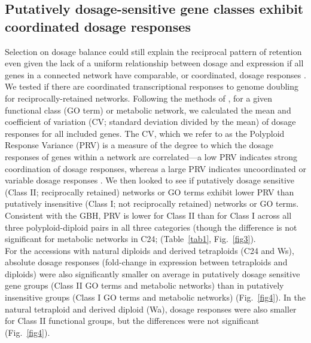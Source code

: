 \documentclass[11pt]{article}
\begin{document}
\subsection*{Putatively dosage-sensitive gene classes exhibit coordinated dosage responses}
Selection on dosage balance could still explain the reciprocal pattern of retention even given the lack of a uniform relationship between dosage and expression if all genes in a connected network have comparable, or coordinated, dosage responses \citep{coate2016}.
We tested if there are coordinated transcriptional responses to genome doubling for reciprocally-retained networks.
Following the methods of \cite{coate2016}, for a given functional class (GO term) or metabolic network, we calculated the mean and coefficient of variation (CV; standard deviation divided by the mean) of dosage responses for all included genes.
The CV, which we refer to as the Polyploid Response Variance (PRV) is a measure of the degree to which the dosage responses of genes within a network are correlated---a low PRV indicates strong coordination of dosage responses, whereas a large PRV indicates uncoordinated or variable dosage responses \citep{coate2016}.
We then looked to see if putatively dosage sensitive (Class II; reciprocally retained) networks or GO terms exhibit lower PRV than putatively insensitive (Class I; not reciprocally retained) networks or GO terms.
Consistent with the GBH, PRV is lower for Class II than for Class I across all three polyploid-diploid pairs in all three categories (though the difference is not significant for metabolic networks in C24; (Table~\ref{tab1}, Fig.~\ref{fig3}).\\

For the accessions with natural diploids and derived tetraploids (C24 and Ws), absolute dosage responses (fold-change in expression between tetraploids and diploids) were also significantly smaller on average in putatively dosage sensitive gene groups (Class II GO terms and metabolic networks) than in putatively insensitive groups (Class I GO terms and metabolic networks) (Fig.~\ref{fig4}).
In the natural tetraploid and derived diploid (Wa), dosage responses were also smaller for Class II functional groups, but the differences were not significant (Fig.~\ref{fig4}).\\
\end{document}
